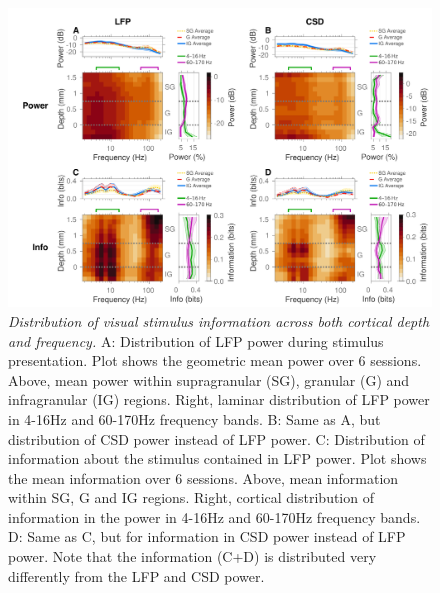 \documentclass[english,a4paper]{article}
\begin{document}
\begin{figure}
\centering \includegraphics[width=\columnwidth]{fig2}
%
\caption{%
\textit{Distribution of visual stimulus information across both cortical depth 
and frequency.}
A: Distribution of LFP power during stimulus presentation. Plot shows the geometric mean 
power over 6 sessions. Above, mean power within supragranular (SG), granular 
(G) and infragranular (IG) regions. Right, laminar distribution of LFP power in
4-16Hz and 60-170Hz frequency bands.
B: Same as A, but distribution of CSD power instead of LFP power.
C: Distribution of information about the stimulus contained in LFP power. Plot 
shows the mean information over 6 sessions. Above, mean information within SG, G 
and IG regions. Right, cortical distribution of information in the power in
4-16Hz and 60-170Hz frequency bands.
D: Same as C, but for information in CSD power instead of LFP power.
Note that the information (C+D) is distributed very differently from the LFP and CSD power.
}
%
\end{figure}
\end{document}
